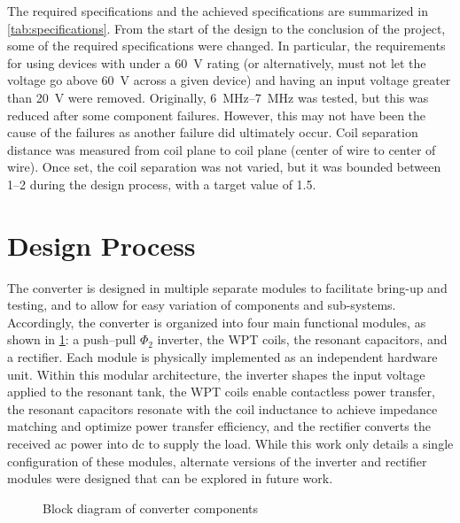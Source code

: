 \documentclass[journal, 9pt, letterpaper, english]{IEEEtran}[2015/08/26]
\begin{document}
The required specifications and the achieved specifications are summarized in \cref{tab:specifications}.
From the start of the design to the conclusion of the project, some of the required specifications were changed.
In particular, the requirements for using devices with under a \qty{60}{\volt} rating (or alternatively, must not let the voltage go above \qty{60}{\volt} across a given device) and having an input voltage greater than \qty{20}{\volt} were removed.
Originally, \qtyrange{6}{7}{\mega\hertz} was tested, but this was reduced after some component failures. However, this may not have been the cause of the failures as another failure did ultimately occur.
Coil separation distance was measured from coil plane to coil plane (center of wire to center of wire).
Once set, the coil separation was not varied, but it was bounded between \qtyrange{1}{2}{\inch} during the design process, with a target value of \qty{1.5}{\inch}.

\begin{table}[H]
	\centering
	\tiny
	\resizebox{0.95\columnwidth}{!}{}
	\caption{Specifications}
	\label{tab:specifications}
\end{table}

\section {Design Process}
\label{sec:design}
The converter is designed in multiple separate modules to facilitate bring-up and testing, and  to allow for easy variation of components and sub-systems.
Accordingly, the converter is organized into four main functional modules, as shown in \cref{fig:converter-block}: a push–pull $\Phi_2$ inverter, the WPT coils, the resonant capacitors, and a rectifier.
Each module is physically implemented as an independent hardware unit.
Within this modular architecture, the inverter shapes the input voltage applied to the resonant tank, the WPT coils enable contactless power transfer, the resonant capacitors resonate with the coil inductance to achieve impedance matching and optimize power transfer efficiency, and the rectifier converts the received ac power into dc to supply the load.
While this work only details a single configuration of these modules, alternate versions of the inverter and rectifier modules were designed that can be explored in future work.
\begin{figure}[]
	\centering
	
	\caption{Block diagram of converter components}
	\label{fig:converter-block}
\end{figure}
\end{document}
